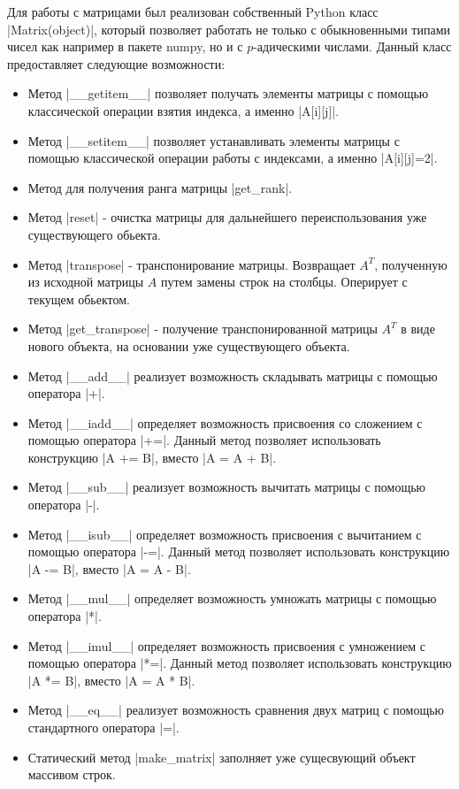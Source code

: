 \documentclass[master, och, diploma, times]{sty/SCWorks}
\theoremstyle{plain}
\theoremstyle{definition}
\begin{document}
Для работы с матрицами был реализован собственный Python класс \\ |Matrix(object)|, который позволяет работать не только с обыкновенными типами чисел как например в пакете numpy, но и с $p$-адическими числами. Данный класс предоставляет следующие возможности:
\begin{itemize}
\item Метод |__getitem__| позволяет получать элементы матрицы с помощью классической операции взятия индекса, а именно |A[i][j]|.
\item Метод |__setitem__| позволяет устанавливать элементы матрицы с помощью классической операции работы с индексами, а именно |A[i][j]=2|.
\item Метод для получения ранга матрицы |get_rank|.
\item Метод |reset| - очистка матрицы для дальнейшего переиспользования уже существующего обьекта.
\item Метод |transpose| - транспонирование матрицы. Возвращает $A^{T}$, полученную из исходной матрицы $A$ путем замены строк на столбцы. Оперирует с текущем обьектом.
\item Метод |get_transpose| - получение транспонированной матрицы $A^{T}$ в виде нового объекта, на основании уже существующего объекта.
\item Метод |__add__| реализует возможность складывать матрицы с помощью оператора |+|.
\item Метод |__iadd__| определяет возможность присвоения со сложением с помощью оператора |+=|. Данный метод позволяет использовать конструкцию |A += B|, вместо |A = A + B|.
\item Метод |__sub__| реализует возможность вычитать матрицы с помощью оператора |-|.
\item Метод |__isub__| определяет возможность присвоения с вычитанием с помощью оператора |-=|. Данный метод позволяет использовать конструкцию |A -= B|, вместо |A = A - B|.
\item Метод |__mul__| определяет возможность умножать матрицы с помощью оператора |*|.
\item Метод |__imul__| определяет возможность присвоения с умножением с помощью оператора |*=|. Данный метод позволяет использовать конструкцию |A *= B|, вместо |A = A * B|.
\item Метод |__eq__| реализует возможность сравнения двух матриц с помощью стандартного оператора |=|.
\item Статический метод |make_matrix| заполняет уже сущесвующий объект массивом строк.

\end{itemize}
\end{document}
